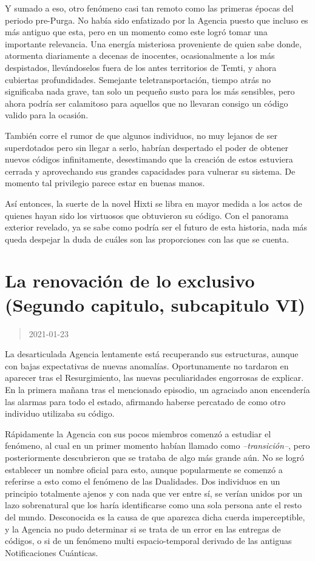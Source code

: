 \documentclass[
  spanish,
]{book}
\begin{document}
Y sumado a eso, otro fenómeno casi tan remoto como las primeras épocas del periodo pre-Purga. No había sido enfatizado por la Agencia puesto que incluso es más antiguo que esta, pero en un momento como este logró tomar una importante relevancia. Una energía misteriosa proveniente de quien sabe donde, atormenta diariamente a decenas de inocentes, ocasionalmente a los más despistados, llevándoselos fuera de los antes territorios de Temti, y ahora cubiertas profundidades. Semejante teletransportación, tiempo atrás no significaba nada grave, tan solo un pequeño susto para los más sensibles, pero ahora podría ser calamitoso para aquellos que no llevaran consigo un código valido para la ocasión.

También corre el rumor de que algunos individuos, no muy lejanos de ser superdotados pero sin llegar a serlo, habrían despertado el poder de obtener nuevos códigos infinitamente, desestimando que la creación de estos estuviera cerrada y aprovechando sus grandes capacidades para vulnerar su sistema. De momento tal privilegio parece estar en buenas manos.

Así entonces, la suerte de la novel Hixti se libra en mayor medida a los actos de quienes hayan sido los virtuosos que obtuvieron su código. Con el panorama exterior revelado, ya se sabe como podría ser el futuro de esta historia, nada más queda despejar la duda de cuáles son las proporciones con las que se cuenta.

\hypertarget{la-renovaciuxf3n-de-lo-exclusivo-segundo-capitulo-subcapitulo-vi}{%
\section{La renovación de lo exclusivo (Segundo capitulo, subcapitulo VI)}\label{la-renovaciuxf3n-de-lo-exclusivo-segundo-capitulo-subcapitulo-vi}}

\begin{quote}
2021-01-23
\end{quote}

La desarticulada Agencia lentamente está recuperando sus estructuras, aunque con bajas expectativas de nuevas anomalías. Oportunamente no tardaron en aparecer tras el Resurgimiento, las nuevas peculiaridades engorrosas de explicar. En la primera mañana tras el mencionado episodio, un agraciado anon encendería las alarmas para todo el estado, afirmando haberse percatado de como otro individuo utilizaba su código.

Rápidamente la Agencia con sus pocos miembros comenzó a estudiar el fenómeno, al cual en un primer momento habían llamado como \emph{--transición--}, pero posteriormente descubrieron que se trataba de algo más grande aún. No se logró establecer un nombre oficial para esto, aunque popularmente se comenzó a referirse a esto como el fenómeno de las Dualidades.
Dos individuos en un principio totalmente ajenos y con nada que ver entre sí, se verían unidos por un lazo sobrenatural que los haría identificarse como una sola persona ante el resto del mundo. Desconocida es la causa de que aparezca dicha cuerda imperceptible, y la Agencia no pudo determinar si se trata de un error en las entregas de códigos, o si de un fenómeno multi espacio-temporal derivado de las antiguas Notificaciones Cuánticas.
\end{document}
